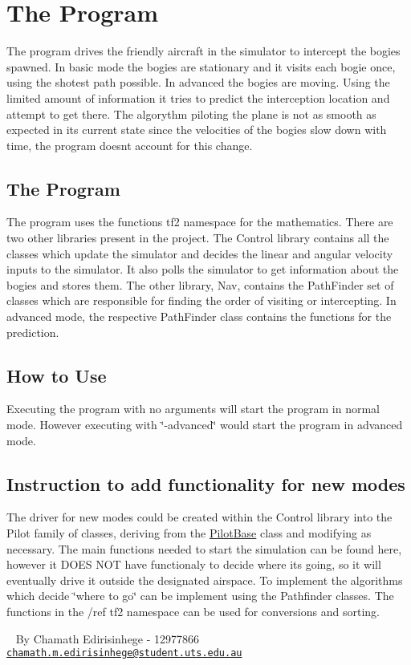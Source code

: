 \hypertarget{index_a}{}\section{The Program}\label{index_a}
The program drives the friendly aircraft in the simulator to intercept the bogies spawned. In basic mode the bogies are stationary and it visits each bogie once, using the shotest path possible. In advanced the bogies are moving. Using the limited amount of information it tries to predict the interception location and attempt to get there. The algorythm piloting the plane is not as smooth as expected in its current state since the velocities of the bogies slow down with time, the program doesnt account for this change.\hypertarget{index_a}{}\subsection{The Program}\label{index_a}
The program uses the functions tf2 namespace for the mathematics. There are two other libraries present in the project. The Control library contains all the classes which update the simulator and decides the linear and angular velocity inputs to the simulator. It also polls the simulator to get information about the bogies and stores them. The other library, Nav, contains the Path\+Finder set of classes which are responsible for finding the order of visiting or intercepting. In advanced mode, the respective Path\+Finder class contains the functions for the prediction.\hypertarget{index_b}{}\subsection{How to Use}\label{index_b}
Executing the program with no arguments will start the program in normal mode. However executing with \char`\"{}-\/advanced\char`\"{} would start the program in advanced mode.\hypertarget{index_c}{}\subsection{Instruction to add functionality for new modes}\label{index_c}
The driver for new modes could be created within the Control library into the Pilot family of classes, deriving from the \hyperlink{classPilotBase}{Pilot\+Base} class and modifying as necessary. The main functions needed to start the simulation can be found here, however it D\+O\+ES N\+OT have functionaly to decide where its going, so it will eventually drive it outside the designated airspace. To implement the algorithms which decide \char`\"{}where to go\char`\"{} can be implement using the Pathfinder classes. The functions in the /ref tf2 namespace can be used for conversions and sorting.

~\newline
 By Chamath Edirisinhege -\/ 12977866 ~\newline
 \href{mailto:chamath.m.edirisinhege@student.uts.edu.au}{\tt chamath.\+m.\+edirisinhege@student.\+uts.\+edu.\+au} 